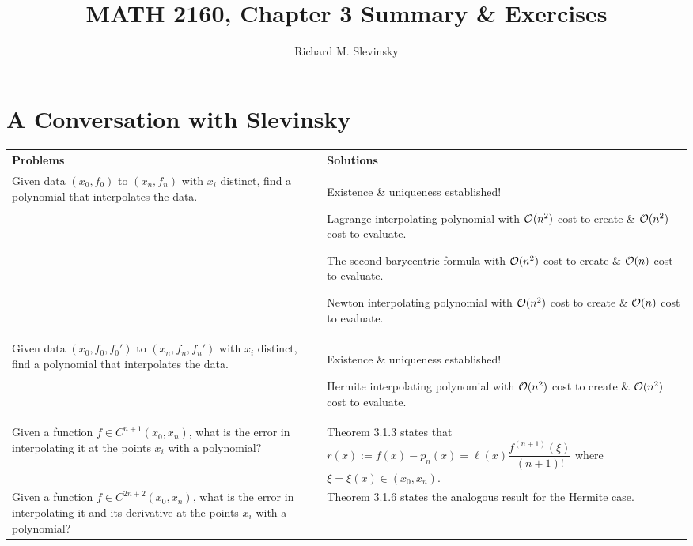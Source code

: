 \documentclass[11pt,letterpaper]{article}
\begin{document}
\title{MATH 2160, Chapter 3 Summary \& Exercises}
\author{Richard M. Slevinsky}
\date{}
\maketitle

\section*{A Conversation with Slevinsky}

\begin{longtable}{p{}|p{}}
\hline
Problems & Solutions\\
\hline
Given data $(x_0,f_0)$ to $(x_n,f_n)$ with $x_i$ distinct, find a polynomial that interpolates the data. & Existence \& uniqueness established!

Lagrange interpolating polynomial with $\mathcal{O}(n^2)$ cost to create \& $\mathcal{O}(n^2)$ cost to evaluate.

The second barycentric formula with $\mathcal{O}(n^2)$ cost to create \& $\mathcal{O}(n)$ cost to evaluate.

Newton interpolating polynomial with $\mathcal{O}(n^2)$ cost to create \& $\mathcal{O}(n)$ cost to evaluate.\\

Given data $(x_0,f_0,f_0')$ to $(x_n,f_n,f_n')$ with $x_i$ distinct, find a polynomial that interpolates the data. & Existence \& uniqueness established!

Hermite interpolating polynomial with $\mathcal{O}(n^2)$ cost to create \& $\mathcal{O}(n^2)$ cost to evaluate.\\

Given a function $f\in C^{n+1}(x_0,x_n)$, what is the error in interpolating it at the points $x_i$ with a polynomial? & Theorem 3.1.3 states that $r(x) := f(x) - p_n(x) = \ell(x)\dfrac{f^{(n+1)}(\xi)}{(n+1)!}$ where $\xi = \xi(x)\in(x_0,x_n)$.\\

Given a function $f\in C^{2n+2}(x_0,x_n)$, what is the error in interpolating it and its derivative at the points $x_i$ with a polynomial? & Theorem 3.1.6 states the analogous result for the Hermite case.\\


\end{longtable}
\end{document}
